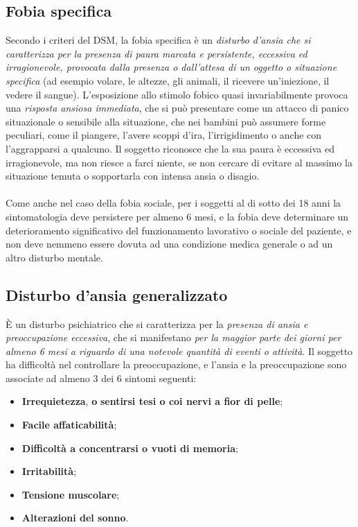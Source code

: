 \subsection{Fobia specifica}

Secondo i criteri del DSM, la fobia specifica è un \emph{disturbo
d'ansia che si caratterizza per la presenza di paura marcata e
persistente, eccessiva ed irragionevole, provocata dalla presenza o
dall'attesa di un oggetto o situazione specifica} (ad esempio volare, le
altezze, gli animali, il ricevere un'iniezione, il vedere il sangue).
L'esposizione allo stimolo fobico quasi invariabilmente provoca una
\emph{risposta ansiosa immediata}, che si può presentare come un attacco
di panico situazionale o sensibile alla situazione, che nei bambini può
assumere forme peculiari, come il piangere, l'avere scoppi d'ira,
l'irrigidimento o anche con l'aggrapparsi a qualcuno. Il soggetto
riconosce che la sua paura è eccessiva ed irragionevole, ma non riesce a
farci niente, se non cercare di evitare al massimo la situazione temuta
o sopportarla con intensa ansia o disagio.
\\\\
Come anche nel caso della fobia sociale, per i soggetti al di sotto dei
18 anni la sintomatologia deve persistere per almeno 6 mesi, e la fobia
deve determinare un deterioramento significativo del funzionamento
lavorativo o sociale del paziente, e non deve nemmeno essere dovuta ad
una condizione medica generale o ad un altro disturbo mentale.

\subsection{Disturbo d'ansia generalizzato}

È un disturbo psichiatrico che si caratterizza per la \emph{presenza di
ansia e preoccupazione eccessiva}, che si manifestano \emph{per la
maggior parte dei giorni per almeno 6 mesi a riguardo di una notevole
quantità di eventi o attività}. Il soggetto ha difficoltà nel
controllare la preoccupazione, e l'ansia e la preoccupazione sono
associate ad almeno 3 dei 6 sintomi seguenti:

\begin{itemize}
\item
  \textbf{Irrequietezza}, \textbf{o} \textbf{sentirsi tesi o coi nervi a
  fior di pelle};
\item
  \textbf{Facile affaticabilità};
\item
  \textbf{Difficoltà a concentrarsi o vuoti di memoria};
\item
  \textbf{Irritabilità};
\item
  \textbf{Tensione muscolare};
\item
  \textbf{Alterazioni del sonno}.
\end{itemize}

